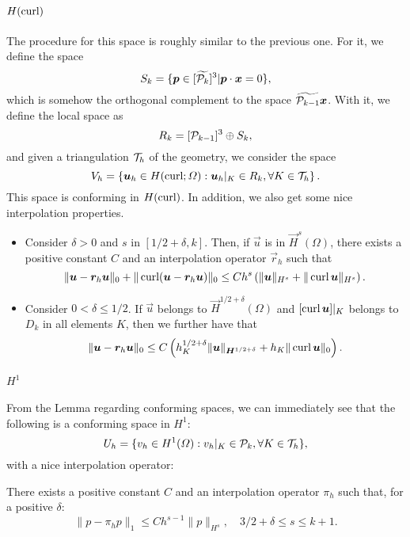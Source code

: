 \paragraph{$H(\curl)$} The procedure for this space is roughly similar to the previous one. For it, we define the space
\begin{equation}
    S_k = \{ \vec p \in [\widetilde{\P_k}]^3 | \vec p \cdot \vec x = 0 \},
\end{equation}
which is somehow the orthogonal complement to the space $\widetilde{\P_{k-1}}\vec x$. With it, we define the local space as 
\begin{equation}
    R_k = [\P_{k-1}]^3\oplus S_k,
\end{equation}
and given a triangulation $\T_h$ of the geometry, we consider the space
\begin{equation}
    V_h = \left\{ \vec u_h \in H(\curl;\Omega): \vec u_h|_K \in R_k, \forall K\in \T_h\right\}.
\end{equation}
This space is conforming in $H(\curl)$. In addition, we also get some nice interpolation properties. 
\begin{theorem} \phantom{.}
    \begin{itemize}
        \item Consider $\delta>0$ and $s$ in $[1/2+\delta, k]$. Then, if $\vec u$ is in $\vec H^s(\Omega)$, there exists a positive constant $C$ and an interpolation operator $\vec r_h$ such that 
        \begin{equation}
            \| \vec u - \vec r_h \vec u\|_0 + \| \curl(\vec u - \vec r_h \vec u) \|_0 \leq C h^s \left(\| \vec u\|_{H^s} + \| \curl \vec u \|_{H^s}\right) .
        \end{equation}
        \item Consider $0<\delta\leq 1/2$. If $\vec u$ belongs to $\vec H^{1/2+\delta}(\Omega)$ and $[\curl \vec u]|_K$ belongs to $D_k$ in all elements $K$, then we further have that
        \begin{equation}
            \|\vec u - \vec r_h \vec u\|_0 \leq C\left(h_K^{1/2+\delta} \| \vec u\|_{\vec H^{1/2+\delta}} + h_K \| \curl \vec u\|_0 \right).
        \end{equation}
    \end{itemize}
\end{theorem}
\paragraph{$H^1$} From the Lemma regarding conforming spaces, we can immediately see that the following is a conforming space in $H^1$: 
\begin{equation}
    U_h = \{ v_h \in H^1(\Omega): v_h|_K \in \P_k, \forall K\in \T_h\},
\end{equation}
with a nice interpolation operator:
\begin{theorem}
    There exists a positive constant $C$ and an interpolation operator $\pi_h$ such that, for a positive $\delta$: 
    \begin{equation*}
        \|p - \pi_h p \|_1 \leq C h^{s-1} \|p\|_{H^s}, \quad 3/2+\delta \leq s \leq k+1 .
    \end{equation*}
\end{theorem}
